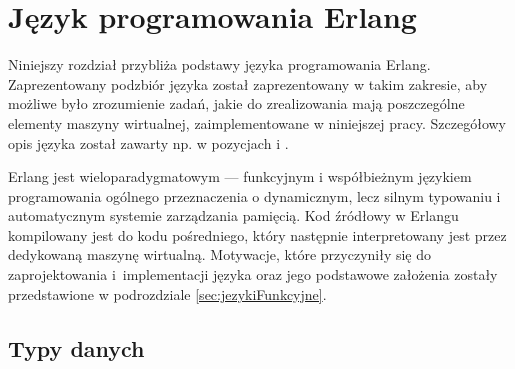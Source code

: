 \chapter{Język programowania Erlang}
\label{cha:erlang}

Niniejszy rozdział przybliża podstawy języka programowania Erlang.
Zaprezentowany podzbiór języka został zaprezentowany w takim zakresie, aby możliwe było zrozumienie zadań, jakie do zrealizowania mają poszczególne elementy maszyny wirtualnej, zaimplementowane w niniejszej pracy.
Szczegółowy opis języka został zawarty np. w pozycjach \cite{Armstrong2013} i \cite{Hebert2013}.


Erlang jest wieloparadygmatowym --- funkcyjnym i współbieżnym językiem programowania ogólnego przeznaczenia o dynamicznym, lecz silnym typowaniu i automatycznym systemie zarządzania pamięcią.
Kod źródłowy w Erlangu kompilowany jest do kodu pośredniego, który następnie interpretowany jest przez dedykowaną maszynę wirtualną.
Motywacje, które przyczyniły się do zaprojektowania i~implementacji języka oraz jego podstawowe założenia zostały przedstawione w podrozdziale \ref{sec:jezykiFunkcyjne}.

\section{Typy danych}
\label{sec:erlangTypy}

